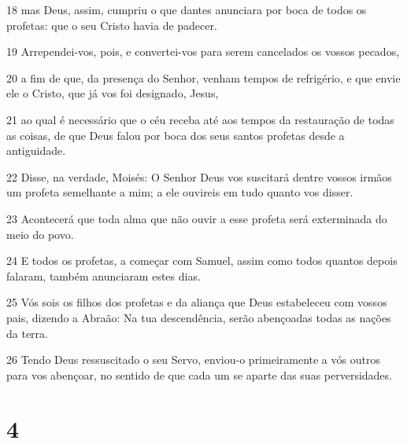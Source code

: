 \par 18 mas Deus, assim, cumpriu o que dantes anunciara por boca de todos os profetas: que o seu Cristo havia de padecer.
\par 19 Arrependei-vos, pois, e convertei-vos para serem cancelados os vossos pecados,
\par 20 a fim de que, da presença do Senhor, venham tempos de refrigério, e que envie ele o Cristo, que já vos foi designado, Jesus,
\par 21 ao qual é necessário que o céu receba até aos tempos da restauração de todas as coisas, de que Deus falou por boca dos seus santos profetas desde a antiguidade.
\par 22 Disse, na verdade, Moisés: O Senhor Deus vos suscitará dentre vossos irmãos um profeta semelhante a mim; a ele ouvireis em tudo quanto vos disser.
\par 23 Acontecerá que toda alma que não ouvir a esse profeta será exterminada do meio do povo.
\par 24 E todos os profetas, a começar com Samuel, assim como todos quantos depois falaram, também anunciaram estes dias.
\par 25 Vós sois os filhos dos profetas e da aliança que Deus estabeleceu com vossos pais, dizendo a Abraão: Na tua descendência, serão abençoadas todas as nações da terra.
\par 26 Tendo Deus ressuscitado o seu Servo, enviou-o primeiramente a vós outros para vos abençoar, no sentido de que cada um se aparte das suas perversidades.

\chapter{4}

